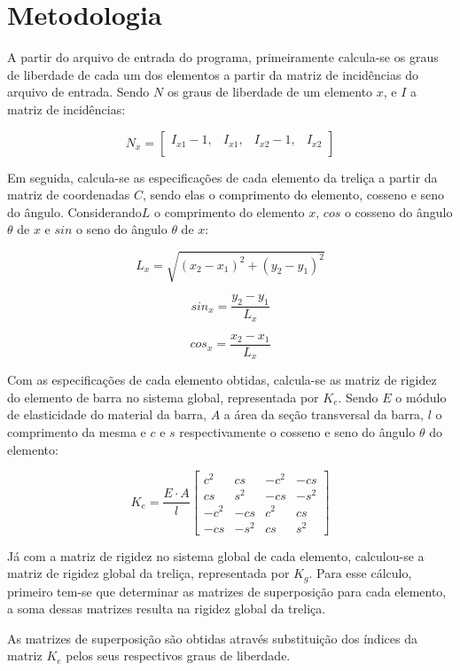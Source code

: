 \documentclass[paper=a4, fontsize=11pt]{scrartcl}
\begin{document}
\section{Metodologia}

A partir do arquivo de entrada do programa, primeiramente calcula-se os graus de liberdade de cada um dos elementos a partir da matriz de incidências do arquivo de entrada. Sendo \(N\) os graus de liberdade de um elemento \(x\), e \(I\) a matriz de incidências:


\[N_x = 
\begin{bmatrix}
I_{x1} - 1 ,& I_{x1} ,& I_{x2} - 1 ,& I_{x2}  \\
\end{bmatrix}
\]

Em seguida, calcula-se as especificações de cada elemento da treliça a partir da matriz de coordenadas \(C\), sendo elas o comprimento do elemento, cosseno e seno do ângulo. Considerando\(L\) o comprimento do elemento \(x\), \(cos\) o cosseno do ângulo \(\theta\) de \(x\) e \(sin\) o seno do ângulo \(\theta\) de \(x\):

\[L_x = \sqrt{(x_2 - x_1)^2 + (y_2 - y_1)^2}\]

\[sin_x = \frac{y_2 - y_1}{L_x}\]

\[cos_x = \frac{x_2 - x_1}{L_x} \]

Com as especificações de cada elemento obtidas, calcula-se as matriz de rigidez do elemento de barra no sistema global, representada por \(K_e\). Sendo \(E\) o módulo de elasticidade do material da barra, \(A\) a área da seção transversal da barra, \(l\) o comprimento da mesma e \(c\) e \(s\) respectivamente o cosseno e seno do ângulo \(\theta\) do elemento:

\[K_e = \frac{E \cdot A}{l}
\begin{bmatrix}
c^2 & cs & -c^2 & -cs\\
cs & s^2 & -cs & -s^2 \\
-c^2 & -cs & c^2 & cs \\
-cs & -s^2 & cs & s^2
\end{bmatrix}
\]

Já com a matriz de rigidez no sistema global de cada elemento, calculou-se a matriz de rigidez global da treliça, representada por \(K_g\). Para esse cálculo, primeiro tem-se que determinar as matrizes de superposição para cada elemento, a soma dessas matrizes resulta na rigidez global da treliça. 
	
As matrizes de superposição são obtidas através substituição dos índices da matriz \(K_e\) pelos seus respectivos graus de liberdade.
\end{document}
